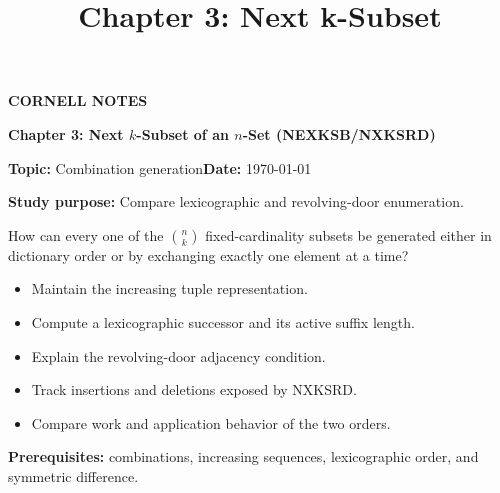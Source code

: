 \documentclass[10pt,letterpaper]{article}
\title{Chapter 3: Next k-Subset}
\author{}
\date{}
\begin{document}
\maketitle
\begin{tcolorbox}[colback=Paper,colframe=Ink]{\small\bfseries\color{Teal}CORNELL NOTES}\par{\raggedright\LARGE\bfseries Chapter 3: Next $k$-Subset of an $n$-Set (NEXKSB/NXKSRD)\par}\medskip\textbf{Topic:} Combination generation\hfill\textbf{Date:} \today\par\textbf{Study purpose:} Compare lexicographic and revolving-door enumeration.\end{tcolorbox}
\begin{tcolorbox}[colback=Teal!5,colframe=Teal,title=Essential question]How can every one of the $\binom nk$ fixed-cardinality subsets be generated either in dictionary order or by exchanging exactly one element at a time?\end{tcolorbox}
\begin{tcolorbox}[colback=white,colframe=Mist,title=Learning objectives]\begin{itemize}\item Maintain the increasing tuple representation.\item Compute a lexicographic successor and its active suffix length.\item Explain the revolving-door adjacency condition.\item Track insertions and deletions exposed by NXKSRD.\item Compare work and application behavior of the two orders.\end{itemize}\textbf{Prerequisites:} combinations, increasing sequences, lexicographic order, and symmetric difference.\end{tcolorbox}
\end{document}
